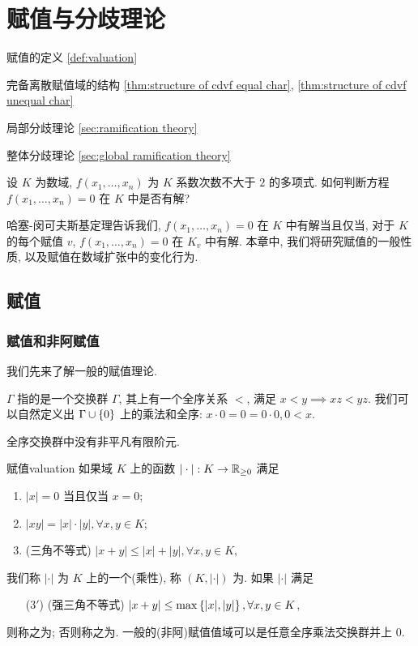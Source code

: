 
\chapter{赋值与分歧理论}
\begin{introduction}
\item 赋值的定义 \ref{def:valuation}
\item 完备离散赋值域的结构 \ref{thm:structure of cdvf equal char}, \ref{thm:structure of cdvf unequal char}
\item 局部分歧理论 \ref{sec:ramification theory}
\item 整体分歧理论 \ref{sec:global ramification theory}
\end{introduction}

\begin{question*}{}
设 $K$ 为数域, $f(x_1,\dots,x_n)$ 为 $K$ 系数次数不大于 $2$ 的多项式. 如何判断方程 $f(x_1,\dots,x_n)=0$ 在 $K$ 中是否有解?
\end{question*}

哈塞-闵可夫斯基定理告诉我们, $f(x_1,\dots,x_n)=0$ 在 $K$ 中有解当且仅当, 对于 $K$ 的每个赋值 $v$, $f(x_1,\dots,x_n)=0$ 在 $K_v$ 中有解. 本章中, 我们将研究赋值的一般性质, 以及赋值在数域扩张中的变化行为.

\section{赋值}
\subsection{赋值和非阿赋值}
我们先来了解一般的赋值理论.

\begin{definition}{}{}
 $\Gamma$ 指的是一个交换群 $\Gamma$, 其上有一个全序关系 $<$, 满足 $x<y\implies xz<yz$. 我们可以自然定义出 $\Gamma\cup\left\{0\right\}$ 上的乘法和全序: $x\cdot 0=0=0\cdot 0,0<x$.
\end{definition}

\begin{exercise}
全序交换群中没有非平凡有限阶元.
\end{exercise}

\begin{definition}{赋值}{valuation}
如果域 $K$ 上的函数 $|\cdot|:K\to {\mathbb{R}}_{\ge 0}$ 满足
\begin{enumerate}[(1)]
\item $|x|=0$ 当且仅当 $x=0$;
\item $|xy|=|x|\cdot|y|,\forall x,y\in K$;
\item (三角不等式) $|x+y|\le|x|+|y|,\forall x,y\in K$,
\end{enumerate}
我们称 $|\cdot|$ 为 $K$ 上的一个(乘性), 称 $(K,|\cdot|)$ 为. 如果 $|\cdot|$ 满足
\begin{enumerate}
\item[(3$'$)] (强三角不等式) $|x+y|\le\max\left\{|x|,|y|\right\},\forall x,y\in K$,
\end{enumerate}
则称之为; 否则称之为. 
一般的(非阿)赋值值域可以是任意全序乘法交换群并上 $0$.
\end{definition}


